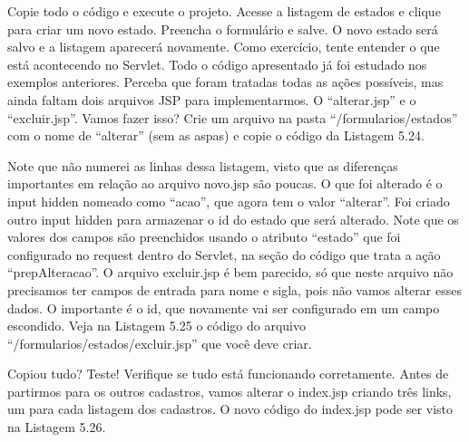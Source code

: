 
Copie todo o código e execute o projeto. Acesse a listagem de estados e clique para criar um novo estado. Preencha o formulário e salve. O novo estado será salvo e a listagem aparecerá novamente. Como exercício, tente entender o que está acontecendo no Servlet. Todo o código apresentado já foi estudado nos exemplos anteriores. Perceba que foram tratadas todas as ações possíveis, mas ainda faltam dois arquivos JSP para implementarmos. O ``alterar.jsp'' e o ``excluir.jsp''. Vamos fazer isso? Crie um arquivo na pasta ``/formularios/estados'' com o nome de ``alterar'' (sem as aspas) e copie o código da Listagem 5.24.


Note que não numerei as linhas dessa listagem, visto que as diferenças importantes em relação ao arquivo novo.jsp são poucas. O que foi alterado é o input hidden nomeado como ``acao'', que agora tem o valor ``alterar''. Foi criado outro input hidden para armazenar o id do estado que será alterado. Note que os valores dos campos são preenchidos usando o atributo ``estado'' que foi configurado no request dentro do Servlet, na seção do código que trata a ação ``prepAlteracao''.
O arquivo excluir.jsp é bem parecido, só que neste arquivo não precisamos ter campos de entrada para nome e sigla, pois não vamos alterar esses dados. O importante é o id, que novamente vai ser configurado em um campo escondido. Veja na Listagem 5.25 o código do arquivo ``/formularios/estados/excluir.jsp'' que você deve criar.


Copiou tudo? Teste! Verifique se tudo está funcionando corretamente. Antes de partirmos para os outros cadastros, vamos alterar o index.jsp criando três links, um para cada listagem dos cadastros. O novo código do index.jsp pode ser visto na Listagem 5.26.

